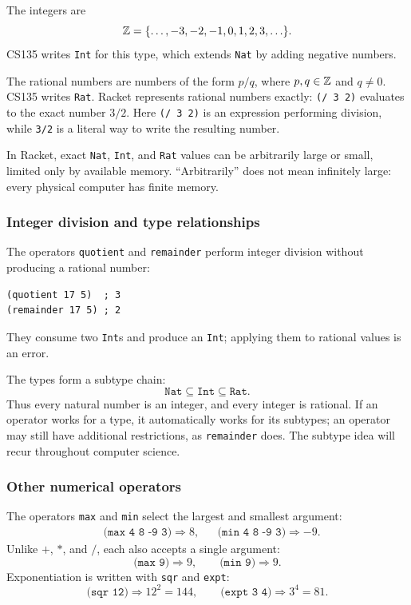\begin{definition}[Integers]
The integers are
\[
  \mathbb{Z}=\{\ldots,-3,-2,-1,0,1,2,3,\ldots\}.
\]
CS135 writes \texttt{Int} for this type, which extends \texttt{Nat} by adding
negative numbers.
\end{definition}

\begin{definition}
The rational numbers are numbers of the form $p/q$, where $p,q\in\mathbb{Z}$ and
$q\ne0$.  CS135 writes \texttt{Rat}.  Racket represents rational numbers
exactly: \texttt{(/ 3 2)} evaluates to the exact number $3/2$.  Here
\texttt{(/ 3 2)} is an expression performing division, while \texttt{3/2}
is a literal way to write the resulting number.
\end{definition}

In Racket, exact \texttt{Nat}, \texttt{Int}, and \texttt{Rat} values can be
arbitrarily large or small, limited only by available memory.  ``Arbitrarily''
does not mean infinitely large: every physical computer has finite memory.

\subsubsection{Integer division and type relationships}
The operators \texttt{quotient} and \texttt{remainder} perform integer
division without producing a rational number:
\begin{verbatim}
(quotient 17 5)  ; 3
(remainder 17 5) ; 2
\end{verbatim}
They consume two \texttt{Int}s and produce an \texttt{Int}; applying them to
rational values is an error.

The types form a subtype chain:
\[
  \texttt{Nat}\subseteq\texttt{Int}\subseteq\texttt{Rat}.
\]
Thus every natural number is an integer, and every integer is rational.  If an
operator works for a type, it automatically works for its subtypes; an
operator may still have additional restrictions, as \texttt{remainder} does.
The subtype idea will recur throughout computer science.

\subsubsection{Other numerical operators}
The operators \texttt{max} and \texttt{min} select the largest and smallest
argument:
\begin{align*}
  &\texttt{(max 4 8 -9 3)} \Rightarrow 8, &
  &\texttt{(min 4 8 -9 3)} \Rightarrow -9.
\end{align*}
Unlike $+$, $*$, and $/$, each also accepts a single argument:
\[
  \texttt{(max 9)}\Rightarrow9, \qquad
  \texttt{(min 9)}\Rightarrow9.
\]
Exponentiation is written with \texttt{sqr} and \texttt{expt}:
\[
  \texttt{(sqr 12)}\Rightarrow 12^2=144, \qquad
  \texttt{(expt 3 4)}\Rightarrow 3^4=81.
\]

